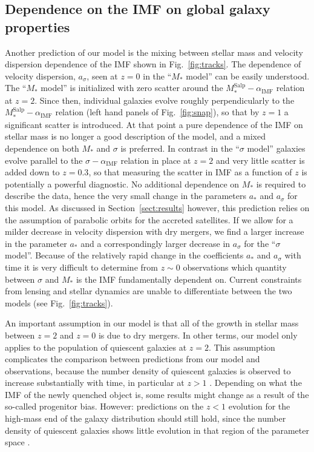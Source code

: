 \documentclass[usenatbib]{mnras}
\def\msalp{M_*^{\mathrm{Salp}}}
\def\aimf{\alpha_{\mathrm{IMF}}}
\def\Sref#1{Section~\ref{#1}\xspace}
\def\Fref#1{Fig.~\ref{#1}\xspace}
\begin{document}
\subsection{Dependence on the IMF on global galaxy properties}

Another prediction of our model is the mixing between stellar mass and
velocity dispersion dependence of the IMF shown in \Fref{fig:tracks}.
The dependence of velocity dispersion, $a_\sigma$, seen at $z=0$ in
the ``$M_*$ model'' can be easily understood.  The ``$M_*$ model'' is
initialized with zero scatter around the $\msalp-\aimf$ relation at
$z=2$.  Since then, individual galaxies evolve roughly perpendicularly
to the $\msalp-\aimf$ relation (left hand panels of \Fref{fig:snap}),
so that by $z=1$ a significant scatter is introduced. At that point a
pure dependence of the IMF on stellar mass is no longer a good
description of the model, and a mixed dependence on both $M_*$ and
$\sigma$ is preferred.  In contrast in the ``$\sigma$ model'' galaxies
evolve parallel to the $\sigma-\aimf$ relation in place at $z=2$ and
very little scatter is added down to $z=0.3$, so that measuring the
scatter in IMF as a function of $z$ is potentially a powerful
diagnostic. No additional dependence on $M_*$ is required to describe
the data, hence the very small change in the parameters $a_*$ and
$a_\sigma$ for this model.  As discussed in \Sref{sect:results}
  however, this prediction relies on the assumption of parabolic
  orbits for the accreted satellites. If we allow for a milder
  decrease in velocity dispersion with dry mergers, we find a larger
  increase in the parameter $a_*$ and a correspondingly larger
  decrease in $a_\sigma$ for the ``$\sigma$ model''. Because of the
relatively rapid change in the coefficients $a_*$ and $a_\sigma$ with
time it is very difficult to determine from $z\sim0$ observations
which quantity between $\sigma$ and $M_*$ is the IMF fundamentally
dependent on. Current constraints from lensing and stellar dynamics
are unable to differentiate between the two models (see
\Fref{fig:tracks}).

An important assumption in our model is that all of the growth in
stellar mass between $z=2$ and $z=0$ is due to dry mergers. In other
terms, our model only applies to the population of quiescent galaxies
at $z=2$. This assumption complicates the comparison between
predictions from our model and observations, because the number
density of quiescent galaxies is observed to increase substantially
with time, in particular at $z>1$ \citep[e.g.][]{Ilb++13,
  Cas++13}. Depending on what the IMF of the newly quenched object is,
some results might change as a result of the so-called progenitor
bias. However: predictions on the $z<1$ evolution for the high-mass
end of the galaxy distribution should still hold, since the number
density of quiescent galaxies shows little evolution in that region of
the parameter space \citep{Lop++12}.
\end{document}
